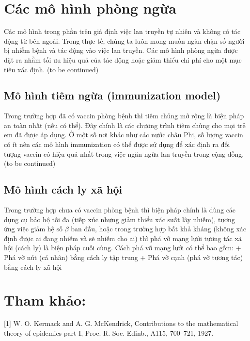 \documentclass[]{book}
\begin{document}
\section{Các mô hình phòng ngừa}\label{cac-mo-hinh-phong-nga}

Các mô hình trong phần trên giả định việc lan truyền tự nhiên và không
có tác động từ bên ngoài. Trong thực tế, chúng ta luôn mong muốn ngăn
chặn số người bị nhiễm bệnh và tác động vào việc lan truyền. Các mô hình
phòng ngừa được đặt ra nhằm tối ưu hiệu quả của tác động hoặc giảm thiểu
chi phí cho một mục tiêu xác định. (to be continued)

\subsection{Mô hình tiêm ngừa (immunization
model)}\label{mo-hinh-tiem-nga-immunization-model}

Trong trường hợp đã có vaccin phòng bệnh thì tiêm chủng mở rộng là biện
pháp an toàn nhất (nếu có thể). Đây chính là các chương trình tiêm chủng
cho mọi trẻ em đã được áp dụng. Ở một số nơi khác như các nước châu Phi,
số lượng vaccin có ít nên các mô hình immunization có thể được sử dụng
để xác định ra đối tượng vaccin có hiệu quả nhất trong việc ngăn ngừa
lan truyền trong cộng đồng. (to be continued)

\subsection{Mô hình cách ly xã hội}\label{mo-hinh-cach-ly-xa-hi}

Trong trường hợp chưa có vaccin phòng bệnh thì biện pháp chính là dùng
các dụng cụ bảo hộ tối đa (tiếp xúc nhưng giảm thiểu xác suất lây
nhiễm), tương ứng việc giảm hệ số \(\beta\) ban đầu, hoặc trong trường
hợp bất khả kháng (không xác định được ai đang nhiễm và sẽ nhiễm cho ai)
thì phá vỡ mạng lưới tương tác xã hội (cách ly) là biện pháp cuối cùng.
Cách phá vỡ mạng lưới có thể bao gồm: + Phá vỡ nút (cá nhân) bằng cách
ly tập trung + Phá vỡ cạnh (phá vỡ tương tác) bằng cách ly xã hội

\section{Tham khảo:}\label{tham-khao-1}

{[}1{]} W. O. Kermack and A. G. McKendrick, Contributions to the
mathematical theory of epidemics part I, Proc. R. Soc. Edinb., A115,
700--721, 1927.
\end{document}
